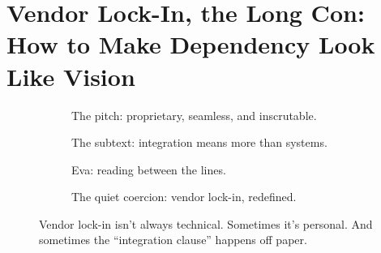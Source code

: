 \section{Vendor Lock-In, the Long Con: How to Make Dependency Look Like Vision}

\begin{figure}[H]
  \centering
  
  \begin{subfigure}[t]{0.45\textwidth}
  \centering
  \caption*{The pitch: proprietary, seamless, and inscrutable.}
  \end{subfigure}
  \hfill
  \begin{subfigure}[t]{0.45\textwidth}
  \centering
  \caption*{The subtext: integration means more than systems.}
  \end{subfigure}
  
  \vspace{1em}
  
  \begin{subfigure}[t]{0.45\textwidth}
  \centering
  \caption*{Eva: reading between the lines.}
  \end{subfigure}
  \hfill
  \begin{subfigure}[t]{0.45\textwidth}
  \centering
  \caption*{The quiet coercion: vendor lock-in, redefined.}
  \end{subfigure}
  
  \caption{Vendor lock-in isn’t always technical. Sometimes it’s personal. And sometimes the “integration clause” happens off paper.}
  \end{figure}

